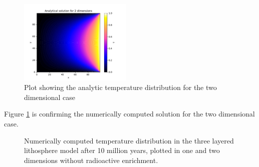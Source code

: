 \documentclass[10pt,a4paper]{article}
\begin{document}
\begin{figure} [H]
	\centering
	\includegraphics[width=0.48\textwidth]{../plots/2Danal.pdf}
	\caption{\label{fig:2danal} Plot showing the analytic temperature distribution for the two dimensional case}
\end{figure}

\noindent Figure \ref{fig:2danal} is confirming the numerically computed solution for the two dimensional case. 


\begin{figure} [H]
	\centering
	\caption{\label{10notenriched}Numerically computed temperature distribution in the three layered lithosphere model after 10 million years, plotted in one and two dimensions without radioactive enrichment. }
\end{figure}
\end{document}
